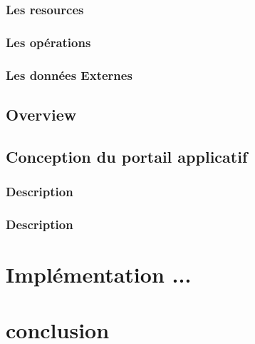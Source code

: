 \documentclass[a4paper,12pt]{article}
\begin{document}
\subsubsection{Les resources}
\subsubsection{Les opérations}
\subsubsection{Les données Externes}%

\subsection{Overview}

\subsection{Conception du portail applicatif}%
\subsubsection{Description}
\subsubsection{Description}

\section{Implémentation ...}
\section{conclusion}
\end{document}

